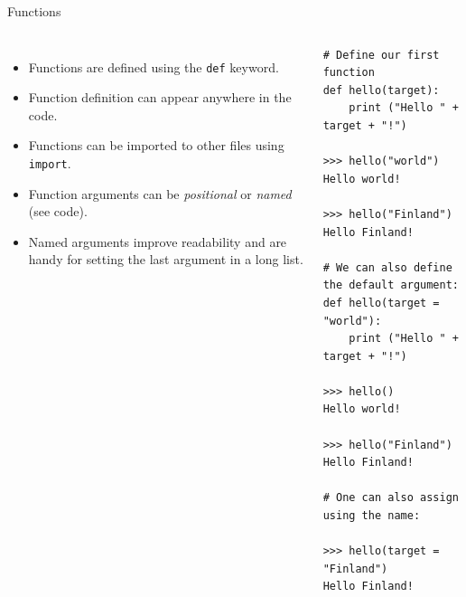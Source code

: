 \documentclass[10pt, aspectratio=169]{beamer} %
\begin{document}
\begin{frame}[fragile,allowframebreaks=0.8]
 {Functions}
\begin{columns}[onlytextwidth]

\begin{itemize}
\item Functions are defined using the \verb+def+ keyword.
\item Function definition can appear anywhere in the code.
\item Functions can be imported to other files using \verb+import+.
\item Function arguments can be \emph{positional} or \emph{named} (see code).
\item Named arguments improve readability and are handy for 
setting the last argument in a long list.
\end{itemize}
\begin{lstlisting}
# Define our first function
def hello(target):
    print ("Hello " + target + "!")
		
>>> hello("world")
Hello world!

>>> hello("Finland")
Hello Finland!

# We can also define the default argument:
def hello(target = "world"):
    print ("Hello " + target + "!")

>>> hello()
Hello world!

>>> hello("Finland")
Hello Finland!

# One can also assign using the name:

>>> hello(target = "Finland")
Hello Finland!
\end{lstlisting}

\end{columns}
\end{frame}
\end{document}
